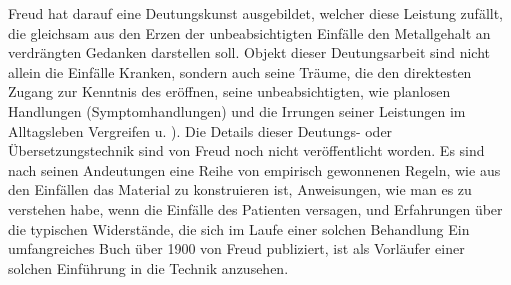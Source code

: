 \documentclass[twoside=true,titlepage=false,open=any, parskip=never, fontsize=10pt, headings=small, chapterprefix=false, appendixprefix=false]{scrbook}
\begin{document}
            
        \pstart
        Freud hat darauf eine Deutungskunst
                ausgebildet, welcher
               diese Leistung zufällt, die gleichsam aus den Erzen der unbeabsichtigten Einfälle den Metallgehalt an verdrängten Gedanken darstellen soll.
               Objekt dieser Deutungsarbeit sind nicht allein die Einfälle  Kranken, sondern auch seine Träume, die den direktesten Zugang zur Kenntnis des 
               eröffnen, seine
               unbeabsichtigten, wie planlosen Handlungen (Symptomhandlungen) und die Irrungen
               seiner Leistungen im Alltagsleben 
               Vergreifen u. ). Die Details dieser Deutungs- oder Übersetzungstechnik sind
               von Freud noch nicht veröffentlicht
                     worden. Es sind nach seinen Andeutungen eine Reihe von
               empirisch gewonnenen Regeln, wie aus den Einfällen das  Material zu konstruieren ist, Anweisungen, wie man es zu verstehen
               habe, wenn die Einfälle des Patienten versagen, und Erfahrungen über die  typischen Widerstände, die sich im Laufe einer solchen Behandlung  Ein umfangreiches Buch über 1900 von Freud publiziert, ist als
               Vorläufer einer solchen Einführung in die Technik anzusehen.
        \pend
    
\end{document}

